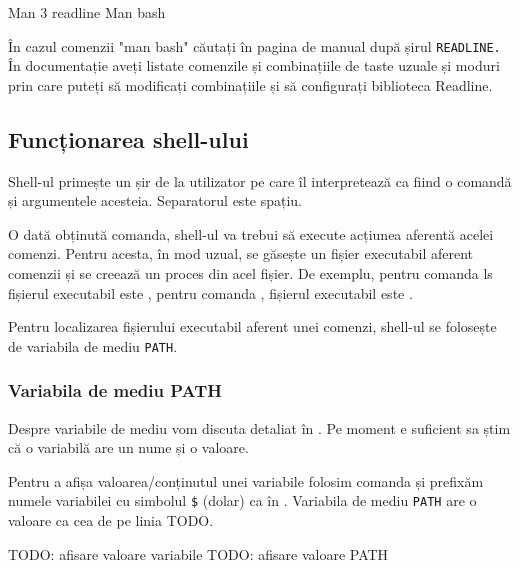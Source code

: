 \begin{screen}[caption={Documentație pentru combinațiile de taste din shell (prin Readline)},label={lst:cli:man-readline}]
Man 3 readline
Man bash
\end{screen}

În cazul comenzii "man bash" căutați în pagina de manual după șirul \texttt{READLINE.} În
documentație aveți listate comenzile și combinațiile de taste uzuale și moduri
prin care puteți să modificați combinațiile și să configurați biblioteca
Readline.

\subsection{Funcționarea shell-ului}
\label{sec:cli-shell-func}

Shell-ul primește un șir de la utilizator pe care îl interpretează ca fiind o
comandă și argumentele acesteia. Separatorul este spațiu.

O dată obținută comanda, shell-ul va trebui să execute acțiunea aferentă acelei
comenzi. Pentru acesta, în mod uzual, se găsește un fișier executabil aferent
comenzii și se creează un proces din acel fișier. De exemplu, pentru comanda ls
fișierul executabil este , pentru comanda , fișierul executabil este
.

Pentru localizarea fișierului executabil aferent unei comenzi, shell-ul se
folosește de variabila de mediu \texttt{PATH}.

\subsubsection{Variabila de mediu PATH}
\label{sec:cli-path}

Despre variabile de mediu vom discuta detaliat în . Pe moment e
suficient sa știm că o variabilă are un nume și o valoare.

Pentru a afișa valoarea/conținutul unei variabile folosim comanda  și prefixăm numele variabilei cu simbolul \texttt{\$} (dolar)
ca în . Variabila de mediu \texttt{PATH} are o valoare ca cea de pe linia TODO.

\begin{screen}[caption={Afișarea valorii variabilelor shell},label={lst:cli:show-vars}]
TODO: afisare valoare variabile
TODO: afisare valoare PATH
\end{screen}

